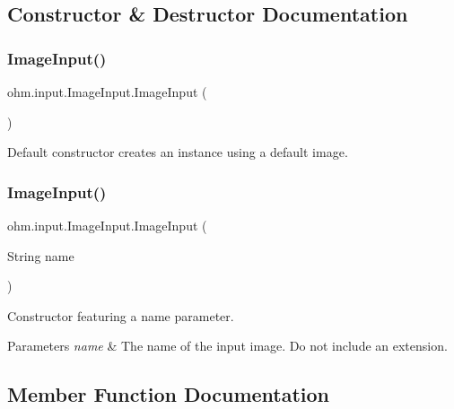\subsection{Constructor \& Destructor Documentation}
\hypertarget{classohm_1_1input_1_1_image_input_af8fb2e251e80452993fd0400ae596628}{}\label{classohm_1_1input_1_1_image_input_af8fb2e251e80452993fd0400ae596628} 
\subsubsection{\texorpdfstring{Image\+Input()}{ImageInput()}\hspace{0.1cm}{\footnotesize\ttfamily [1/2]}}
{\footnotesize\ttfamily ohm.\+input.\+Image\+Input.\+Image\+Input (\begin{DoxyParamCaption}{ }\end{DoxyParamCaption})}

Default constructor creates an instance using a default image. \hypertarget{classohm_1_1input_1_1_image_input_a3c9f1be5fc0574d2e2470c86fb1dbe90}{}\label{classohm_1_1input_1_1_image_input_a3c9f1be5fc0574d2e2470c86fb1dbe90} 
\subsubsection{\texorpdfstring{Image\+Input()}{ImageInput()}\hspace{0.1cm}{\footnotesize\ttfamily [2/2]}}
{\footnotesize\ttfamily ohm.\+input.\+Image\+Input.\+Image\+Input (\begin{DoxyParamCaption}\item[{String}]{name }\end{DoxyParamCaption})}

Constructor featuring a name parameter. 
\begin{DoxyParams}{Parameters}
{\em name} & The name of the input image. Do not include an extension. \\
\hline
\end{DoxyParams}


\subsection{Member Function Documentation}
\hypertarget{classohm_1_1input_1_1_image_input_a68160a9bd9d395f7b2646e9b55388198}{}\label{classohm_1_1input_1_1_image_input_a68160a9bd9d395f7b2646e9b55388198} 
